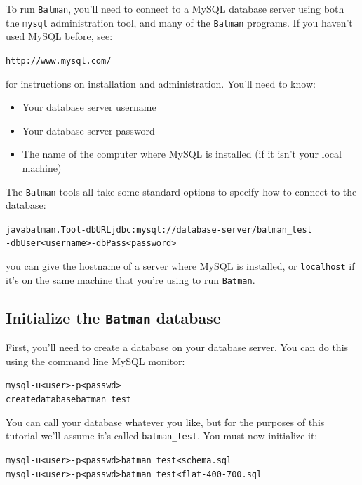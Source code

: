 \documentclass[a4paper, 11pt]{article}
\newcommand{\bm}{{\tt Batman}\xspace}
\begin{document}
To run {\tt Batman}, you'll need to connect to a MySQL database server using
both the {\tt mysql} administration tool, and many of the {\tt Batman} programs.
If you haven't used MySQL before, see:

\begin{alltt}    http://www.mysql.com/\end{alltt}

for instructions on installation and administration.  You'll need to know:

\begin{itemize}
\item{Your database server username}
\item{Your database server password}
\item{The name of the computer where MySQL is installed (if it isn't your local machine)}
\end{itemize}

The {\tt Batman} tools all take some standard options to specify how to connect
to the database:

\begin{alltt}java batman.Tool -dbURL jdbc:mysql://database-server/batman_test 
                    -dbUser <username> -dbPass <password>\end{alltt}

you can give the hostname of a server where MySQL is installed, or {\tt localhost}
if it's on the same machine that you're using to run \bm.

\subsection{Initialize the \bm database}

First, you'll need to create a database on your database server.  You can do this using
the command line MySQL monitor:

\begin{alltt}    mysql -u<user> -p<passwd>
    create database batman_test\end{alltt}

You can call your database whatever you like, but for the purposes of this tutorial
we'll assume it's called {\tt batman\_test}.  You must now initialize it:

\begin{alltt}    mysql -u<user> -p<passwd> batman_test <schema.sql
    mysql -u<user> -p<passwd> batman_test <flat-400-700.sql\end{alltt}
\end{document}
